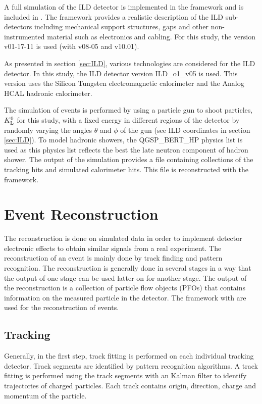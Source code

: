 A full \geant simulation of the ILD detector is implemented in the \mokka framework and is included in \ilcsoft. The \mokka framework provides a realistic description of the ILD sub-detectors including mechanical support structures, gaps and other non-instrumented material such as electronics and cabling. For this study, the \ilcsoft version v01-17-11 is used (with \mokka v08-05 and \geant v10.01).

As presented in section \ref{sec:ILD}, various technologies are considered for the ILD detector. In this study, the ILD detector version ILD\_o1\_v05 is used. This version uses the Silicon Tungsten electromagnetic calorimeter and the Analog HCAL hadronic calorimeter.

The simulation of events is performed by using a particle gun to shoot particles, $K^0_{\mathrm{L}}$ for this study, with a fixed energy in different regions of the detector by randomly varying the angles $\theta$ and $\phi$ of the gun (see ILD coordinates in section \ref{sec:ILD}). To model hadronic showers, the QGSP\_BERT\_HP physics list is used as this physics list reflects the best the late neutron component of hadron shower. The output of the simulation provides a \lcio file containing collections of the tracking hits and simulated calorimeter hits. This file is reconstructed with the \marlin framework.

\section{Event Reconstruction}
\label{sec:recochain}

The reconstruction is done on simulated data in order to implement detector electronic effects to obtain similar signals from a real experiment. The reconstruction of an event is mainly done by track finding and pattern recognition. The reconstruction is generally done in several stages in a way that the output of one stage can be used latter on for another stage. The output of the reconstruction is a collection of particle flow objects (PFOs) that contains information on the measured particle in the detector. The \ilcsoft framework with \marlin are used for the reconstruction of events.

\subsection{Tracking}

Generally, in the first step, track fitting is performed on each individual tracking detector. Track segments are identified by pattern recognition algorithms. A track fitting is performed using the track segments with an Kalman filter \cite{Li2013, Fruhwirth:1987fm} to identify trajectories of charged particles. Each track contains origin, direction, charge and momentum of the particle.

